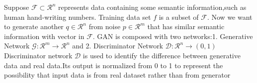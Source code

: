 \documentclass[
    ngerman,american
    ]{scrartcl}
\newcommand{\lang}{en}
\begin{document}
\begin{description}[style=unboxed]
        \end{description}
        
        \sectionInitialTOC{\lang}
        Suppose $\mathcal F\subset \mathcal R^n$ represents data containing some semantic information,such as human hand-writing numbers.
        Training data set $f$ is a subset of $\mathcal F$.
        Now we want to generate another $q\in \mathcal R^n$ from noise $p\in \mathcal R^m$ that has similar semantic information with vector in $\mathcal F$.
        GAN is composed with two networks:1. Generative Network $\mathcal G:\mathcal R^m\to \mathcal R^n$ and 2. Discriminator Network $\mathcal D:\mathcal R^n \to (0,1)$\\
        Discriminator network $\mathcal D$ is used to identify the difference between generative data and real data.Its output is normalized from 0 to 1 to represent the possibility that input data is from real dataset rather than from generator  
\end{document}
